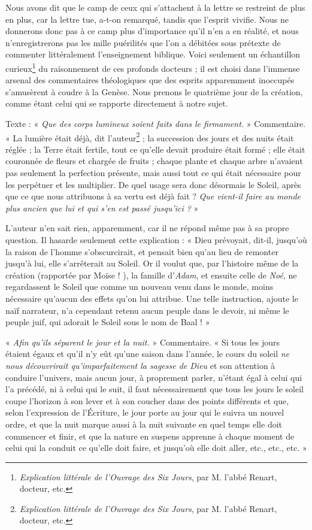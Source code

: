 \documentclass[a4paper, 11pt, oneside, landscape]{article}
\begin{document}
Nous avons dit que le camp de ceux qui s'attachent à la lettre se restreint de plus en plus, car la lettre tue, a-t-on remarqué, tandis que l'esprit vivifie. Nous ne donnerons donc pas à ce camp plus d'importance qu'il n'en a en réalité, et nous n'enregistrerons pas les mille puérilités que l'on a débitées sous prétexte de commenter littéralement l'enseignement biblique. Voici seulement un échantillon curieux\footnote{\emph{Explication littérale de l'Ouvrage des Six Jours}, par M. l'abbé Renart, docteur, etc.} du raisonnement de ces profonds docteurs ; il est choisi dans l'immense arsenal des commentaires théologiques que des esprits apparemment inoccupés s'amusèrent à coudre à la Genèse. Nous prenons le quatrième jour de la création, comme étant celui qui se rapporte directement à notre sujet.

Texte : « \emph{Que des corps lumineux soient faits dans le firmament.} » Commentaire. « La lumière était déjà, dit l'auteur\footnote{\emph{Explication littérale de l'Ouvrage des Six Jours}, par M. l'abbé Renart, docteur, etc.} ; la succession des jours et des nuits était réglée ; la Terre était fertile, tout ce qu'elle devait produire était formé ; elle était couronnée de fleurs et chargée de fruits ; chaque plante et chaque arbre n'avaient pas seulement la perfection présente, mais aussi tout ce qui était nécessaire pour les perpétuer et les multiplier. De quel usage sera donc désormais le Soleil, après que ce que nous attribuons à sa vertu est déjà fait ? \emph{Que vient-il faire au monde plus ancien que lui et qui s'en est passé jusqu'ici ?} »

L'auteur n'en sait rien, apparemment, car il ne répond même pas à sa propre question. Il hasarde seulement cette explication : « Dieu prévoyait, dit-il, jusqu'où la raison de l'homme s'obscurcirait, et pensait bien qu'au lieu de remonter jusqu'à lui, elle s'arrêterait au Soleil. Or il voulut que, par l'histoire même de la création (rapportée par Moïse ! ), la famille d'\emph{Adam}, et ensuite celle de \emph{Noé}, ne regardassent le Soleil que comme un nouveau venu dans le monde, moins nécessaire qu'aucun des effets qu'on lui attribue. Une telle instruction, ajoute le naïf narrateur, n'a cependant retenu aucun peuple dans le devoir, ni même le peuple juif, qui adorait le Soleil sous le nom de Baal ! »

« \emph{Afin qu'ils séparent le jour et la nuit.} » Commentaire. « Si tous les jours étaient égaux et qu'il n'y eût qu'une saison dans l'année, le cours du soleil \emph{ne nous découvrirait qu'imparfaitement la sagesse de Dieu} et son attention à conduire l'univers, mais aucun jour, à proprement parler, n'étant égal à celui qui l'a précédé, ni à celui qui le suit, il faut nécessairement que tous les jours le soleil coupe l'horizon à son lever et à son coucher dans des points différents et que, selon l'expression de l'Écriture, le jour porte au jour qui le suivra un nouvel ordre, et que la nuit marque aussi à la nuit suivante en quel temps elle doit commencer et finir, et que la nature en suspens apprenne à chaque moment de celui qui la conduit ce qu'elle doit faire, et jusqu'où elle doit aller, etc., etc., etc. »
\end{document}

